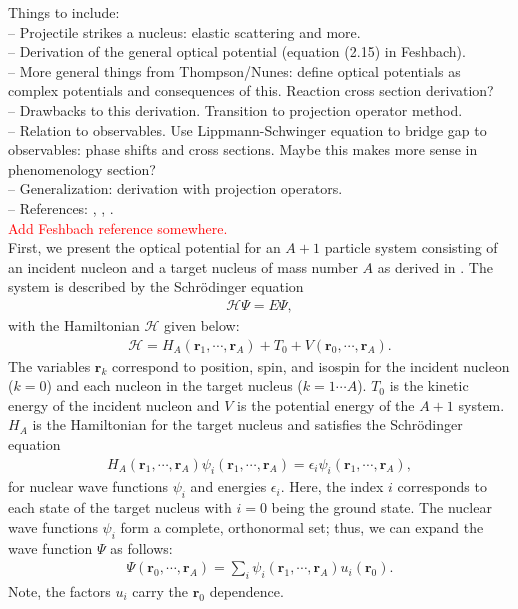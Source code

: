 \documentclass[preprintnumbers,floatfix,aps,prc,preprint,nofootinbib]{revtex4-1}
\begin{document}
Things to include:
\\
-- Projectile strikes a nucleus: elastic scattering and more.
\\
-- Derivation of the general optical potential (equation (2.15) in Feshbach).
\\
-- More general things from Thompson/Nunes: define optical potentials as complex potentials and consequences of this. Reaction cross section derivation?
\\
-- Drawbacks to this derivation. Transition to projection operator method.
\\
-- Relation to observables. Use Lippmann-Schwinger equation to bridge gap to observables: phase shifts and cross sections. Maybe this makes more sense in phenomenology section?
\\
-- Generalization: derivation with projection operators.
\\
-- References: \cite{Feshbach:1958nx}, \cite{Feshbach:1962ut}, \cite{thompson_nunes_2009}.
\\

\textcolor{red}{Add Feshbach reference somewhere.}
\\

First, we present the optical potential for an $A+1$ particle system consisting of an incident nucleon and a target nucleus of mass number $A$ as derived in \cite{Feshbach:1958nx}. The system is described by the Schr\"odinger equation
%
\begin{eqnarray}
	\label{eq:schrodinger_equation}
	\mathcal{H} \Psi = E \Psi,
\end{eqnarray}
%
with the Hamiltonian $\mathcal{H}$ given below:
%
\begin{eqnarray}
	\label{eq:total_hamiltonian}
	\mathcal{H} = H_A(\textbf{r}_1, \cdots , \textbf{r}_A) + T_0 + V(\textbf{r}_0, \cdots , \textbf{r}_A).
\end{eqnarray}
%
The variables $\textbf{r}_k$ correspond to position, spin, and isospin for the incident nucleon ($k=0$) and each nucleon in the target nucleus ($k=1 \cdots A$). $T_0$ is the kinetic energy of the incident nucleon and $V$ is the potential energy of the $A+1$ system. $H_A$ is the Hamiltonian for the target nucleus and satisfies the Schr\"odinger equation
%
\begin{eqnarray}
	\label{eq:nuclear_schrodinger_equation}
	H_A(\textbf{r}_1, \cdots , \textbf{r}_A) \psi_i(\textbf{r}_1, \cdots , \textbf{r}_A) = \epsilon_i \psi_i(\textbf{r}_1, \cdots , \textbf{r}_A),
\end{eqnarray}
%
for nuclear wave functions $\psi_i$ and energies $\epsilon_i$. Here, the index $i$ corresponds to each state of the target nucleus with $i=0$ being the ground state. The nuclear wave functions $\psi_i$ form a complete, orthonormal set; thus, we can expand the wave function $\Psi$ as follows:
%
\begin{eqnarray}
	\label{eq:wave_function}
	\Psi(\textbf{r}_0, \cdots , \textbf{r}_A) = \sum_{i} \psi_i(\textbf{r}_1, \cdots , \textbf{r}_A) u_i(\textbf{r}_0).
\end{eqnarray}
%
Note, the factors $u_i$ carry the $\textbf{r}_0$ dependence.
\\
\end{document}
